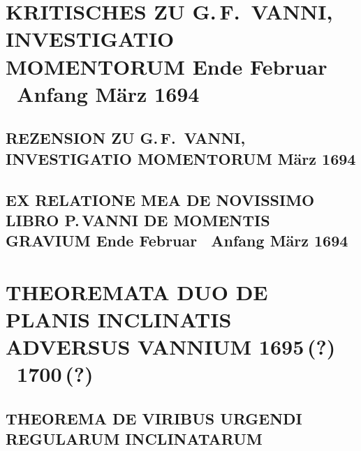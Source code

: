\documentclass[%
fontsize=10pt,
]{scrbook}
\DeclareRobustCommand{\bracks}[1]{%
\textup{\lbrack}#1\textup{\rbrack}}
\begin{document}
\label{60105}		%







\chapter[tocentry={Kritisches zu G.\,F.~Vanni, Investigatio momentorum
\enskip \bracks{Ende Februar \textendash\ Anfang März 1694}},
head={Kritisches zu Vanni, Investigatio momentorum}]
{\MakeUppercase{Kritisches zu G.\,F.~Vanni, Investigatio momentorum}
\newline \bracks{Ende Februar \textendash\ Anfang März 1694}}
\label{intro_vanni-investigatio}

\section[tocentry={Rezension zu G.\,F.~Vanni, Investigatio momentorum
\enskip März 1694%
},
head={Rezension zu Vanni, Investigatio momentorum}]
{\MakeUppercase{Rezension zu G.\,F.~Vanni, Investigatio momentorum}
März 1694%
}
\label{61037}

\section[tocentry={Ex Relatione mea de novissimo libro P.\,Vanni de momentis gravium
\enskip \bracks{Ende Februar \textendash\ Anfang März 1694}},
head={Ex Relatione mea de novissimo libro P.\,Vanni}]
{\MakeUppercase{Ex Relatione mea de novissimo libro P.\,Vanni de momentis gravium} 
\newline \bracks{Ende Februar \textendash\ Anfang März 1694}}
\label{41824}





\chapter[tocentry={Theoremata duo de planis inclinatis adversus Vannium
\enskip \bracks{1695\,(?) \textendash\ 1700\,(?)}},
head={Theoremata duo de planis inclinatis adversus Vannium}]%
{\MakeUppercase{Theoremata duo de planis inclinatis adversus Vannium}
\newline \bracks{1695\,(?) \textendash\ 1700\,(?)}}
\label{intro_theoremata-duo-vanni}

\section[tocentry={Theorema de viribus urgendi regularum inclinatarum
},
head={Theorema de viribus urgendi regularum inclinatarum}]
{\MakeUppercase{Theorema de viribus urgendi regularum inclinatarum}
}
\label{60030}

\end{document}
